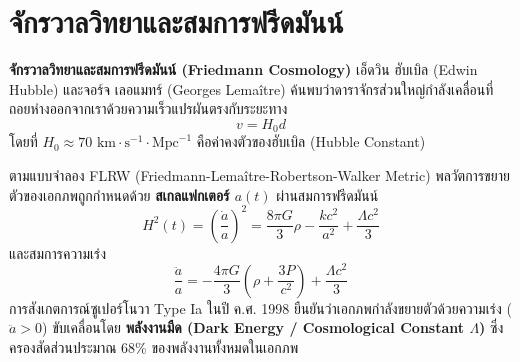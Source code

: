 \section{จักรวาลวิทยาและสมการฟรีดมันน์}

\textbf{จักรวาลวิทยาและสมการฟรีดมันน์ (Friedmann Cosmology)} เอ็ดวิน ฮับเบิล (Edwin Hubble) และจอร์จ เลอแมทร์ (Georges Lemaître) ค้นพบว่าดาราจักรส่วนใหญ่กำลังเคลื่อนที่ถอยห่างออกจากเราด้วยความเร็วแปรผันตรงกับระยะทาง
\begin{equation}
v = H_0 d
\end{equation}
โดยที่ $H_0 \approx 70\text{ km}\cdot\text{s}^{-1}\cdot\text{Mpc}^{-1}$ คือค่าคงตัวของฮับเบิล (Hubble Constant)

ตามแบบจำลอง FLRW (Friedmann-Lemaître-Robertson-Walker Metric) พลวัตการขยายตัวของเอกภพถูกกำหนดด้วย \textbf{สเกลแฟกเตอร์ $a(t)$} ผ่านสมการฟรีดมันน์
\begin{equation}
H^2(t) = \left(\frac{\dot{a}}{a}\right)^2 = \frac{8\pi G}{3} \rho - \frac{k c^2}{a^2} + \frac{\Lambda c^2}{3}
\end{equation}
และสมการความเร่ง
\begin{equation}
\frac{\ddot{a}}{a} = -\frac{4\pi G}{3}\left(\rho + \frac{3P}{c^2}\right) + \frac{\Lambda c^2}{3}
\end{equation}
การสังเกตการณ์ซูเปอร์โนวา Type Ia ในปี ค.ศ. 1998 ยืนยันว่าเอกภพกำลังขยายตัวด้วยความเร่ง ($\ddot{a} > 0$) ขับเคลื่อนโดย \textbf{พลังงานมืด (Dark Energy / Cosmological Constant $\Lambda$)} ซึ่งครองสัดส่วนประมาณ 68\% ของพลังงานทั้งหมดในเอกภพ

